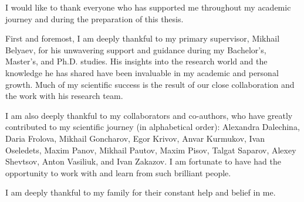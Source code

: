 I would like to thank everyone who has supported me throughout my academic journey and during the preparation of this thesis.

First and foremost, I am deeply thankful to my primary supervisor, Mikhail Belyaev, for his unwavering support and guidance during my Bachelor's, Master's, and Ph.D. studies. His insights into the research world and the knowledge he has shared have been invaluable in my academic and personal growth. Much of my scientific success is the result of our close collaboration and the work with his research team.

I am also deeply thankful to my collaborators and co-authors, who have greatly contributed to my scientific journey (in alphabetical order): Alexandra Dalechina, Daria Frolova, Mikhail Goncharov, Egor Krivov, Anvar Kurmukov, Ivan Oseledets, Maxim Panov, Mikhail Pautov, Maxim Pisov, Talgat Saparov, Alexey Shevtsov, Anton Vasiliuk, and Ivan Zakazov. I am fortunate to have had the opportunity to work with and learn from such brilliant people.

I am deeply thankful to my family for their constant help and belief in me.



